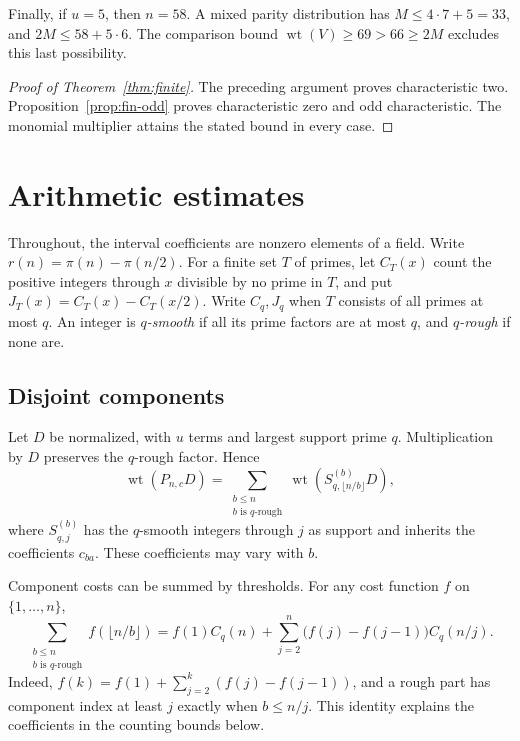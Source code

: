 \documentclass[11pt]{article}
\DeclareMathOperator{\wt}{wt}\DeclareMathOperator{\ord}{ord}
\numberwithin{equation}{section}
\theoremstyle{definition}\newtheorem{definition}[theorem]{Definition}
\theoremstyle{remark}\newtheorem{remark}[theorem]{Remark}
\begin{document}
Finally, if $u=5$, then $n=58$.  A mixed parity distribution has
$M\le4\cdot7+5=33$, and $2M\le58+5\cdot6$.  The comparison bound
$\wt(V)\ge69>66\ge2M$ excludes this last possibility.

\begin{proof}[Proof of Theorem~\ref{thm:finite}]
The preceding argument proves characteristic two.
Proposition~\ref{prop:fin-odd} proves characteristic zero and odd characteristic.
The monomial multiplier attains the stated bound in every case.
\end{proof}

\section{Arithmetic estimates}\label{sec:arithmetic}

Throughout, the interval coefficients are nonzero elements of a field.
Write $r(n)=\pi(n)-\pi(n/2)$.
For a finite set $T$ of primes, let $C_T(x)$ count the positive
integers through $x$ divisible by no prime in $T$, and put
$J_T(x)=C_T(x)-C_T(x/2)$. Write $C_q,J_q$ when $T$ consists of
all primes at most $q$. An integer is \emph{$q$-smooth} if all its
prime factors are at most $q$, and \emph{$q$-rough} if none are.

\subsection{Disjoint components}

Let $D$ be normalized, with $u$ terms and largest support prime $q$.
Multiplication by $D$ preserves the $q$-rough factor. Hence
\begin{equation}\label{arith:eq:prime-rank-decomposition}
 \wt(P_{n,c}D)=\sum_{\substack{b\le n\\b\text{ is }q\text{-rough}}}
                    \wt(S^{(b)}_{q,\lfloor n/b\rfloor}D),
\end{equation}
where $S^{(b)}_{q,j}$ has the $q$-smooth integers through $j$ as
support and inherits the coefficients $c_{ba}$. These coefficients
may vary with $b$.

Component costs can be summed by thresholds. For any cost function
$f$ on $\{1,\ldots,n\}$,
\begin{equation}\label{arith:eq:threshold-sum}
 \sum_{\substack{b\le n\\b\text{ is }q\text{-rough}}}
 f(\lfloor n/b\rfloor)
 =f(1)C_q(n)+\sum_{j=2}^n\bigl(f(j)-f(j-1)\bigr)C_q(n/j).
\end{equation}
Indeed, $f(k)=f(1)+\sum_{j=2}^k(f(j)-f(j-1))$, and a rough part
has component index at least $j$ exactly when $b\le n/j$.
This identity explains the coefficients in the counting bounds below.
\end{document}
